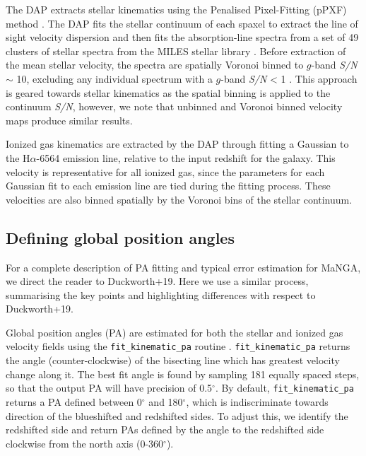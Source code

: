 \documentclass[fleqn,usenatbib]{mnras}
\begin{document}
The DAP extracts stellar kinematics using the Penalised Pixel-Fitting (pPXF) method \citep{cappellari2004,cappellari2017}. The DAP fits the stellar continuum of each spaxel to extract the line of sight velocity dispersion and then fits the absorption-line spectra from a set of 49 clusters of stellar spectra from the MILES stellar library \citep{sanchez2006,falcon2011}. Before extraction of the mean stellar velocity, the spectra are spatially Voronoi binned to $g$-band \textit{S/N} $\sim$ 10, excluding any individual spectrum with a $g$-band \textit{S/N} < 1 \citep{cappellari2003}. This approach is geared towards stellar kinematics as the spatial binning is applied to the continuum \textit{S/N}, however, we note that unbinned and Voronoi binned velocity maps produce similar results. 

Ionized gas kinematics are extracted by the DAP through fitting a Gaussian to the H$\alpha$-6564 emission line, relative to the input redshift for the galaxy. This velocity is representative for all ionized gas, since the parameters for each Gaussian fit to each emission line are tied during the fitting process. These velocities are also binned spatially by the Voronoi bins of the stellar continuum. 

\subsection{Defining global position angles}
For a complete description of PA fitting and typical error estimation for MaNGA, we direct the reader to Duckworth+19. Here we use a similar process, summarising the key points and highlighting differences with respect to Duckworth+19.

Global position angles (PA) are estimated for both the stellar and ionized gas velocity fields using the \texttt{fit\_kinematic\_pa} routine \citep[see Appendix C of][for a description of the process]{krajnovic2006}. \texttt{fit\_kinematic\_pa} returns the angle (counter-clockwise) of the bisecting line which has greatest velocity change along it. The best fit angle is found by sampling 181 equally spaced steps, so that the output PA will have precision of 0.5$^{\circ}$. By default, \texttt{fit\_kinematic\_pa} returns a PA defined between 0$^{\circ}$ and 180$^{\circ}$, which is indiscriminate towards direction of the blueshifted and redshifted sides. To adjust this, we identify the redshifted side and return PAs defined by the angle to the redshifted side clockwise from the north axis (0-360$^{\circ}$). 
\end{document}
